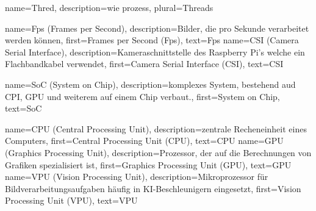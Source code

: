 {
    name={Thred},
    description={wie prozess},
    plural={Threads}
}

{
    name={Fps (Frames per Second)},
    description={Bilder, die pro Sekunde verarbeitet werden können},
    first={Frames per Second (Fps)},
    text={Fps}
}
{
    name={CSI (Camera Serial Interface)},
    description={Kameraschnittstelle des Raspberry Pi's welche 
    ein Flachbandkabel verwendet},
    first={Camera Serial Interface (CSI)},
    text={CSI}
}

{
    name={SoC (System on Chip)},
    description={komplexes System, bestehend aud 
    CPI, GPU und weiterem auf einem Chip verbaut.},
    first={System on Chip},
    text={SoC}
}

{
    name={CPU (Central Processing Unit)},
    description={zentrale Recheneinheit eines Computers},
    first={Central Processing Unit (CPU)},
    text={CPU}
}
{
    name={GPU (Graphics Processing Unit)},
    description={Prozessor, der auf die Berechnungen von 
    Grafiken spezialisiert ist},
    first={Graphics Processing Unit (GPU)},
    text={GPU}
}
{
    name={VPU (Vision Processing Unit)},
    description={Mikroprozessor für Bildverarbeitungsaufgaben 
    häufig in KI-Beschleunigern eingesetzt},
    first={Vision Processing Unit (VPU)},
    text={VPU}
}
